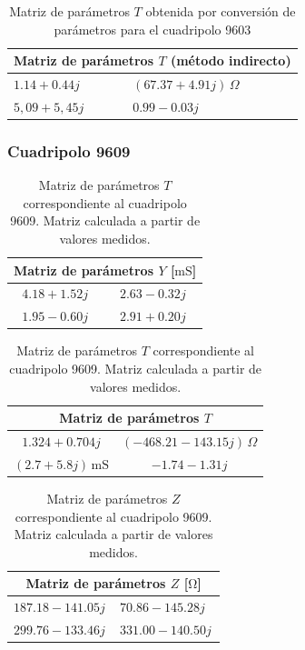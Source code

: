 \begin{table}[H]
\centering
\begin{tabular}{|l|l|}
\hline
\multicolumn{2}{|c|}{\textbf{Matriz de parámetros $T$ (método indirecto)}} \\ \hline
$1.14 + 0.44j$ & $(67.37 + 4.91j)\,\Omega$ \\ \hline
$5,09 + 5,45j$ & $0.99 - 0.03j$ \\ \hline
\end{tabular}
\caption{Matriz de parámetros $T$ obtenida por conversión de parámetros para el cuadripolo 9603}
\label{tab:matriz_T9603_indirecta}
\end{table}
	
	\subsubsection{Cuadripolo 9609}
	

\begin{table}[H]
\centering
\begin{minipage}{0.48\textwidth}
\centering
\begin{tabular}{|c|c|}
\hline
\multicolumn{2}{|c|}{\textbf{Matriz de parámetros $Y$ [$\mathrm{mS}$]}} \\ \hline
$4.18 + 1.52j\,$ & $2.63 - 0.32j\,$ \\ \hline
$1.95 - 0.60j\,$ & $2.91 + 0.20j\,$ \\ \hline
\end{tabular}
\caption{Matriz de parámetros $Y$ correspondiente al cuadripolo 9609. Matriz calculada a partir de valores medidos.}
\label{tab:matriz_Y_9609}
\end{minipage}
\hfill
\begin{minipage}{0.48\textwidth}
\centering
\begin{tabular}{|c|c|}
\hline
\multicolumn{2}{|c|}{\textbf{Matriz de parámetros $T$}} \\ \hline
$1.324 + 0.704j$ & $(-468.21 - 143.15j)\,\Omega$ \\ \hline
$(2.7 + 5.8j)\,\mathrm{mS}$ & $-1.74 - 1.31j$ \\ \hline
\end{tabular}
\caption{Matriz de parámetros $T$ correspondiente al cuadripolo 9609. Matriz calculada a partir de valores medidos.}
\label{tab:matriz_T_9609}
\end{minipage}
\end{table}

\begin{table}[H]
\centering
\begin{tabular}{|l|l|}
\hline
\multicolumn{2}{|c|}{\textbf{Matriz de parámetros $Z$ [$\mathrm{\Omega}$]}} \\ \hline
$187.18 - 141.05j\,$ & $70.86 - 145.28j\,$ \\ \hline
$299.76 - 133.46j\, $ & $331.00 - 140.50j\,$ \\ \hline
\end{tabular}
\caption{Matriz de parámetros $Z$ correspondiente al cuadripolo 9609. Matriz calculada a partir de valores medidos.}
\label{tab:matriz_Z9609}
\end{table}

